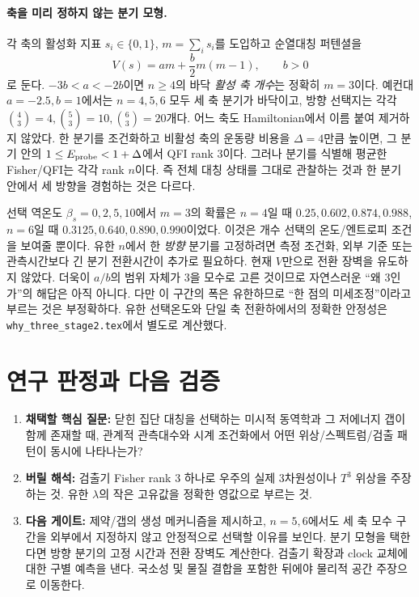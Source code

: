 \documentclass[11pt,a4paper]{article}
\begin{document}
\paragraph{축을 미리 정하지 않는 분기 모형.}
각 축의 활성화 지표 $s_i\in\{0,1\}$, $m=\sum_i s_i$를 도입하고
순열대칭 퍼텐셜을
\begin{equation}
V(s)=a m+\frac b2m(m-1),\qquad b>0
\end{equation}
로 둔다. $-3b<a<-2b$이면 $n\ge4$의 바닥 \emph{활성 축 개수}는
정확히 $m=3$이다. 예컨대 $a=-2.5,b=1$에서는 $n=4,5,6$ 모두
세 축 분기가 바닥이고, 방향 선택지는 각각
$\binom43=4,\binom53=10,\binom63=20$개다. 어느 축도 Hamiltonian에서
이름 붙여 제거하지 않았다. 한 분기를 조건화하고 비활성 축의 운동량
비용을 $\Delta=4$만큼 높이면, 그 분기 안의
$1\le E_{\rm probe}<1+\Delta$에서 QFI rank 3이다.
그러나 분기를 식별해 평균한 Fisher/QFI는 각각 rank $n$이다.
즉 전체 대칭 상태를 그대로 관찰하는 것과 한 분기 안에서
세 방향을 경험하는 것은 다르다.

선택 역온도 $\beta_s=0,2,5,10$에서 $m=3$의 확률은 $n=4$일 때
$0.25,0.602,0.874,0.988$, $n=6$일 때
$0.3125,0.640,0.890,0.990$이었다. 이것은 개수 선택의
온도/엔트로피 조건을 보여줄 뿐이다. 유한 $n$에서 한 \emph{방향}
분기를 고정하려면 측정 조건화, 외부 기준 또는 관측시간보다 긴
분기 전환시간이 추가로 필요하다. 현재 $V$만으로 전환 장벽을
유도하지 않았다. 더욱이 $a/b$의 범위 자체가 3을 모수로 고른
것이므로 자연스러운 ``왜 3인가''의 해답은 아직 아니다.
다만 이 구간의 폭은 유한하므로 ``한 점의 미세조정''이라고 부르는 것은
부정확하다. 유한 선택온도와 단일 축 전환하에서의 정확한 안정성은
\texttt{why\_three\_stage2.tex}에서 별도로 계산했다.

\section{연구 판정과 다음 검증}
\begin{enumerate}
\item \textbf{채택할 핵심 질문:} 닫힌 집단 대칭을 선택하는 미시적
동역학과 그 저에너지 갭이 함께 존재할 때, 관계적 관측대수와
시계 조건화에서 어떤 위상/스펙트럼/검출 패턴이 동시에 나타나는가?
\item \textbf{버릴 해석:} 검출기 Fisher rank 3 하나로 우주의
실제 3차원성이나 $T^3$ 위상을 주장하는 것. 유한 $\lambda$의
작은 고유값을 정확한 영값으로 부르는 것.
\item \textbf{다음 게이트:} 제약/갭의 생성 메커니즘을 제시하고,
$n=5,6$에서도 세 축 모수 구간을 외부에서 지정하지 않고 안정적으로
선택할 이유를 보인다.
분기 모형을 택한다면 방향 분기의 고정 시간과 전환 장벽도 계산한다. 검출기
확장과 clock 교체에 대한 구별 예측을 낸다. 국소성 및 물질 결합을
포함한 뒤에야 물리적 공간 주장으로 이동한다.
\end{enumerate}
\end{document}

